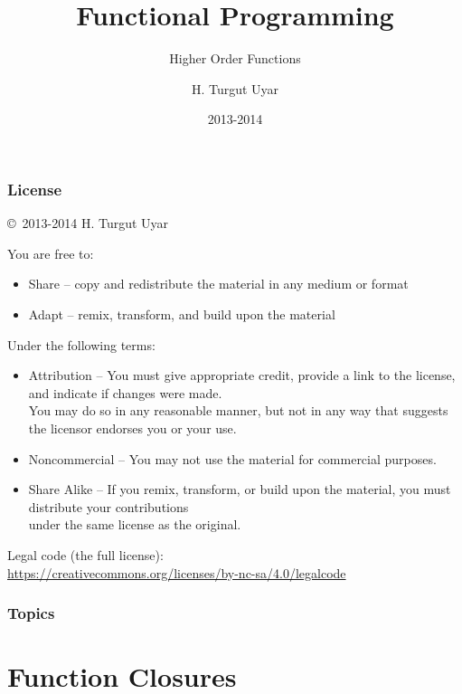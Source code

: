 \documentclass[dvipsnames]{beamer}
\title{Functional Programming}
\subtitle{Higher Order Functions}
\author{H. Turgut Uyar}
\date{2013-2014}
\theoremstyle{plain}
\begin{document}

\begin{frame}
  \titlepage
\end{frame}

\begin{frame}
  \frametitle{License}

  \hfill
  \copyright~2013-2014 H. Turgut Uyar

  \vfill
  \begin{tiny}
    You are free to:
    \begin{itemize}
      \item Share -- copy and redistribute the material in any medium or format
      \item Adapt -- remix, transform, and build upon the material
    \end{itemize}

    Under the following terms:
    \begin{itemize}
      \item Attribution -- You must give appropriate credit, provide a link to
        the license, and indicate if changes were made.\\
        You may do so in any reasonable manner, but not in any way
        that suggests the licensor endorses you or your use.

      \item Noncommercial -- You may not use the material for commercial
        purposes.

      \item Share Alike -- If you remix, transform, or build upon the material,
        you must distribute your contributions\\
        under the same license as the original.
    \end{itemize}
  \end{tiny}

  \vfill
  \begin{small}
    Legal code (the full license):\\
    \url{https://creativecommons.org/licenses/by-nc-sa/4.0/legalcode}
  \end{small}
\end{frame}

\begin{frame}
  \frametitle{Topics}
  \tableofcontents
\end{frame}

\section{Function Closures}
\end{document}

